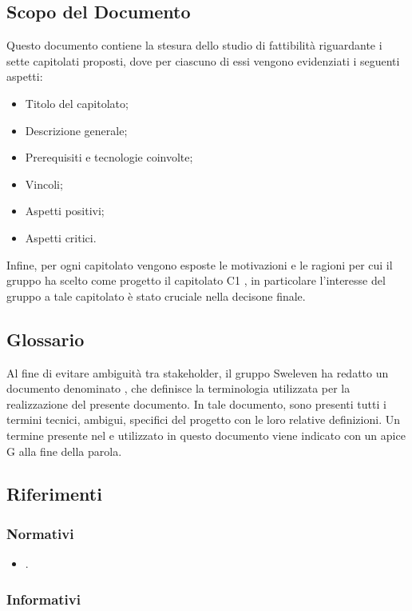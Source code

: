 \subsection{Scopo del Documento}
Questo documento contiene la stesura dello studio di fattibilità riguardante i sette capitolati proposti, dove per ciascuno di essi vengono evidenziati i seguenti aspetti:
\begin{itemize}
    \item Titolo del capitolato;
    \item Descrizione generale;
    \item Prerequisiti e tecnologie coinvolte;
    \item Vincoli;
    \item Aspetti positivi;
    \item Aspetti critici.
\end{itemize}
Infine, per ogni capitolato vengono esposte le motivazioni e le ragioni per cui il gruppo ha scelto come progetto il capitolato C1 \NomeProgetto{}, in particolare l’interesse del gruppo a tale capitolato è stato cruciale nella decisone finale.
\subsection{Glossario}
Al fine di evitare ambiguità tra stakeholder, il gruppo Sweleven ha redatto un documento denominato \Glossariov, che definisce la terminologia utilizzata per la realizzazione del presente documento.
In tale documento, sono presenti tutti i termini tecnici, ambigui, specifici del progetto con le loro relative definizioni.
Un termine presente nel \Glossariov e utilizzato in questo documento viene indicato con un apice G alla fine della parola.
\subsection{Riferimenti}

\subsubsection{Normativi}
\begin{itemize}
\item \NdPv {}.
\end{itemize}

\subsubsection{Informativi}

